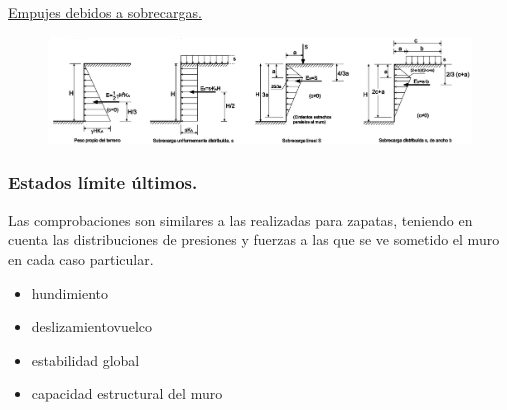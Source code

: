 \noindent \underline{Empujes debidos a sobrecargas.}

\begin{figure}[H]
    \centering
    \includegraphics[width = 1 \linewidth]{Imagenes/Estructuras de contencion - Empujes debidos a sobrecargas.png}
\end{figure}

\subsubsection{Estados límite últimos.}
Las comprobaciones son similares a las realizadas para zapatas, teniendo en cuenta las distribuciones de presiones y fuerzas a las que se ve sometido el muro en cada caso particular.
\begin{itemize}
    \item hundimiento
    \item deslizamientovuelco
    \item estabilidad global
    \item capacidad estructural del muro
\end{itemize}